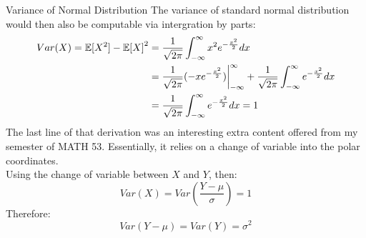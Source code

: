 \begin{ln-theorem}{Variance of Normal Distribution}{}
    The variance of standard normal distribution would then also be computable via intergration by parts:
    \begin{align*}
        Var(X) = \mathbb{E}[X^2] - {\mathbb{E}[X]}^2 &= \frac{1}{\sqrt{2\pi}} \int_{-\infty}^{\infty} x^2 e^{-\frac{x^2}{2}} dx \\
        &= \frac{1}{\sqrt{2\pi}} (-x e^{-\frac{x^2}{2}}) {\bigg|}_{-\infty}^{\infty} + \frac{1}{\sqrt{2\pi}} \int_{-\infty}^{\infty} e^{-\frac{x^2}{2}} dx \\
        &= \frac{1}{\sqrt{2\pi}} \int_{-\infty}^{\infty} e^{-\frac{x^2}{2}} dx = 1
    \end{align*}
    The last line of that derivation was an interesting extra content offered from my semester of MATH 53. Essentially, it relies on a change of variable into the polar coordinates. \\
    Using the change of variable between $X$ and $Y$, then:
    \[
        Var(X) = Var(\frac{Y - \mu}{\sigma}) = 1
    \]
    Therefore:
    \[
        Var(Y - \mu) = Var(Y) = \sigma^2
    \]
\end{ln-theorem}

